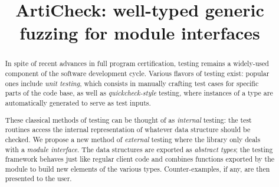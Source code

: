 \documentclass[nonatbib]{sigplanconf}
\newcommand{\arti}{\textsf{ArtiCheck}\xspace}
\begin{document}
\setlength{\pdfpageheight}{\paperheight}
\setlength{\pdfpagewidth}{\paperwidth}

\exclusivelicense


\title{\arti: well-typed generic fuzzing for module interfaces}


\maketitle

\begin{abstract}
  In spite of recent advances in full program certification, testing remains a
  widely-used component of the software development cycle. Various flavors of
  testing exist: popular ones include \emph{unit testing}, which consists in
  manually crafting test cases for specific parts of the code base, as well as
  \emph{quickcheck-style} testing, where instances of a type are automatically
  generated to serve as test inputs.

  These classical methods of testing can be thought of as \emph{internal}
  testing: the test routines access the internal representation of whatever data
  structure should be checked. We propose a new method of \emph{external}
  testing where the library only deals with a \emph{module interface}. The data
  structures are exported as \emph{abstract types}; the testing framework
  behaves just like regular client code and combines functions exported by the
  module to build new elements of the various types. Counter-examples, if any,
  are then presented to the user.
\end{abstract}












\end{document}
